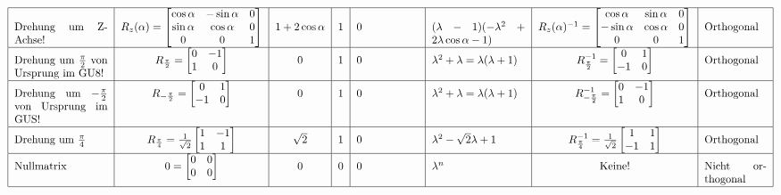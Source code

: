 \begin{sidewaystable}
\begin{equation*}
\begin{tabular}{|p{3cm}|c|c|c|p{2cm}|p{3cm}|c|p{2cm}|}
				\hline
					Drehung um Z-Achse! & $R_{z}(\alpha) = \begin{bmatrix} \cos{\alpha} & -\sin{\alpha} & 0 \\ 
					\sin{\alpha} & \cos{\alpha} & 0 \\ 0 & 0 & 1 \end{bmatrix}$ & $1 + 2 \cos{\alpha}$ & 1 & 0 & 
					$(\lambda - 1)(-\lambda^2 + 2 \lambda \cos{\alpha} - 1)$ & $R_{z}(\alpha)^{-1} = \begin{bmatrix} \cos{\alpha} & \sin{\alpha} & 0 \\ -\sin{\alpha} & \cos{\alpha} & 0 \\ 0 & 0 & 1 \end{bmatrix}$ & Orthogonal \\
				\hline
					Drehung um $\frac{\pi}{2}$ von Ursprung im GU8! & $R_{\frac{\pi}{2}} = \begin{bmatrix} 0 & -1 \\ 1 & 0 \end{bmatrix}$ 
					& 0 & 1 & 0 & $\lambda^2 + \lambda = \lambda (\lambda + 1)$ & $R_{\frac{\pi}{2}}^{-1} = \begin{bmatrix} 0 & 1 \\ -1 & 0 \end{bmatrix}$ & Orthogonal \\
				\hline
					Drehung um $-\frac{\pi}{2}$ von Ursprung im GUS! & $R_{-\frac{\pi}{2}} = \begin{bmatrix} 0 & 1 \\ -1 & 0 \end{bmatrix}$ & 0 & 1 & 0 & $\lambda^2 + \lambda = \lambda (\lambda + 1)$ & $R_{-\frac{\pi}{2}}^{-1} = \begin{bmatrix} 0 & -1 \\ 1 & 0 \end{bmatrix}$ & Orthogonal \\
				\hline
					Drehung um $\frac{\pi}{4}$ & $R_{\frac{\pi}{4}} = \frac{1}{\sqrt{2}} \begin{bmatrix} 1 & -1 \\ 1 & 1 \end{bmatrix}$ & $\sqrt{2}$ & 1 & 0 & $\lambda^2 -\sqrt{2} \lambda + 1$ & $R_{\frac{\pi}{4}}^{-1} = \frac{1}{\sqrt{2}} \begin{bmatrix} 1 & 1 \\ -1 & 1 \end{bmatrix}$ & Orthogonal \\
				\hline
					Nullmatrix & $0 = \begin{bmatrix} 0 & 0 \\ 0 & 0 \end{bmatrix}$	& 0 & 0 & 0 & $\lambda^n$ & Keine! & Nicht orthogonal \\
				\hline
			\end{tabular}
		\end{equation*}
\end{sidewaystable}

